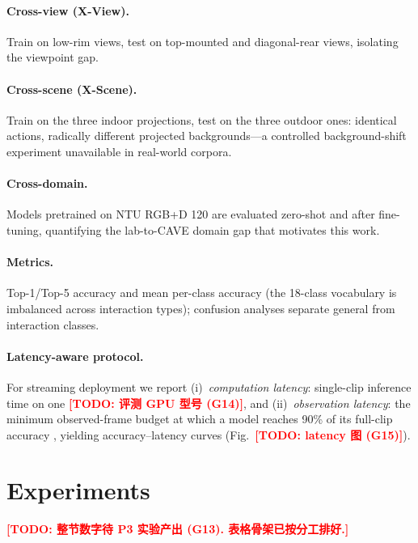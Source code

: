 \documentclass[10pt,twocolumn,letterpaper]{article}
\newcommand{\todocjkfont}{}
\newif\iftodos \todostrue   %
\newcommand{\todo}[1]{\iftodos\textcolor{red}{\textbf{[TODO: {\todocjkfont #1}]}}\fi}
\begin{document}
\paragraph{Cross-view (X-View).}
Train on low-rim views, test on top-mounted and diagonal-rear views,
isolating the viewpoint gap.
\paragraph{Cross-scene (X-Scene).}
Train on the three indoor projections, test on the three outdoor ones:
identical actions, radically different projected backgrounds---a
controlled background-shift experiment unavailable in real-world corpora.
\paragraph{Cross-domain.}
Models pretrained on NTU RGB+D 120 are evaluated zero-shot and after
fine-tuning, quantifying the lab-to-CAVE domain gap that motivates this
work.
\paragraph{Metrics.}
Top-1/Top-5 accuracy and mean per-class accuracy (the 18-class vocabulary
is imbalanced across interaction types); confusion analyses separate
general from interaction classes.
\paragraph{Latency-aware protocol.}
For streaming deployment we report (i)~\emph{computation latency}:
single-clip inference time on one \todo{评测 GPU 型号 (G14)}, and
(ii)~\emph{observation latency}: the minimum observed-frame budget at
which a model reaches 90\% of its full-clip accuracy
\cite{degeest2016oad,eyzaguirre2024squid}, yielding accuracy--latency
curves (Fig.~\todo{latency 图 (G15)}).

\section{Experiments}
\todo{整节数字待 P3 实验产出 (G13). 表格骨架已按分工排好.}
\end{document}
